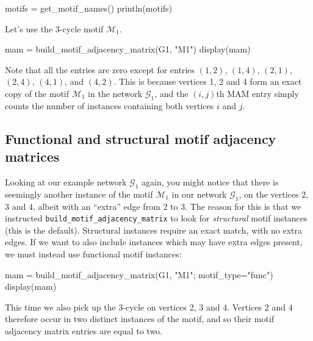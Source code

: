 \documentclass{article}
\begin{document}
\begin{tcolorbox}[colback=black!5!white,colframe=black!15!white]
\begin{juliablock}
motifs = get_motif_names()
println(motifs)
\end{juliablock}
\texttt{\obeylines\printpythontex}
\end{tcolorbox}

Let's use the 3-cycle motif $\mathcal{M}_1$.

\begin{tcolorbox}[colback=black!5!white,colframe=black!15!white]
\begin{juliablock}
mam = build_motif_adjacency_matrix(G1, "M1")
display(mam)
\end{juliablock}
\texttt{\obeylines\printpythontex}
\end{tcolorbox}

Note that all the entries are zero except for entries
$(1,2)$,
$(1,4)$,
$(2,1)$,
$(2,4)$,
$(4,1)$,
and
$(4,2)$.
This is because vertices 1, 2 and 4 form an exact copy of
the motif $\mathcal{M}_1$ in the network $\mathcal{G}_1$,
and the  $(i,j)$th MAM entry simply counts the number of instances
containing both vertices $i$ and $j$.

\subsection{Functional and structural motif adjacency matrices}

Looking at our example network $\mathcal{G}_1$ again,
you might notice that there is seemingly another instance
of the motif $\mathcal{M}_1$
in our network $\mathcal{G}_1$,
on the vertices 2, 3 and 4,
albeit with an ``extra'' edge from 2 to 3.
The reason for this is that we instructed
\texttt{build\_motif\_adjacency\_matrix}
to look for \emph{structural} motif instances (this is the default).
Structural instances require an exact match, with no extra edges.
If we want to also include instances which may have extra edges present,
we must instead use functional motif instances:

\begin{tcolorbox}[colback=black!5!white,colframe=black!15!white]
\begin{juliablock}
mam = build_motif_adjacency_matrix(G1, "M1"; motif_type="func")
display(mam)
\end{juliablock}
\texttt{\obeylines\printpythontex}
\end{tcolorbox}

This time we also pick up the 3-cycle on vertices 2, 3 and 4.
Vertices 2 and 4 therefore occur in two distinct instances
of the motif, and so their motif adjacency matrix entries are equal
to two.
\end{document}
